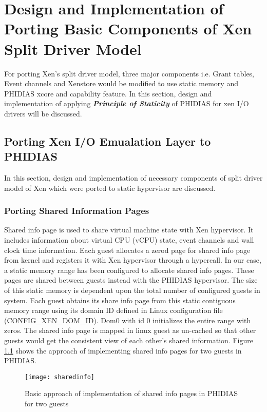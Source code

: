 \chapter{Design and Implementation of Porting Basic Components of Xen Split Driver Model\label{cha:chapter5}}
For porting Xen's split driver model, three major components i.e. Grant tables, Event channels and Xenstore would be modified to use static memory and PHIDIAS xcore and capability feature. In this section, design and implementation of applying \textit{\textbf{Principle of Staticity}} of PHIDIAS for xen I/O drivers will be discussed.

\section{Porting Xen I/O Emualation Layer to PHIDIAS\label{sec:memstatic}}
In this section, design and implementation of necessary components of split driver model of Xen which were ported to static hypervisor are discussed.
\subsection{Porting Shared Information Pages\label{sec:sharedinfo}}
Shared info page is used to share virtual machine state with Xen hypervisor. It includes information about virtual CPU (vCPU) state, event channels and wall clock time information. Each guest allocates a zerod page for shared info page from kernel and registers it with Xen hypervisor through a hypercall. In our case, a static memory range has been configured to allocate shared info pages. These pages are shared between guests instead with the PHIDIAS hypervisor. The size of this static memory is dependent upon the total number of configured guests in system. Each guest obtains its share info page from this static contiguous memory range using its domain ID defined in Linux configuration file (CONFIG\_XEN\_DOM\_ID). Dom0 with id 0 initializes the entire range with zeros. The shared info page is mapped in linux guest as un-cached so that other guests would get the consistent view of each other's shared information. Figure \ref{sharedinfo} shows the approach of implementing shared info pages for two guests in PHIDIAS.
\begin{figure}[!htbp]
	\centering
	\texttt{[image: sharedinfo]}
	\caption{Basic approach of implementation of shared info pages in PHIDIAS for two guests}
	\label{sharedinfo}
\end{figure}

